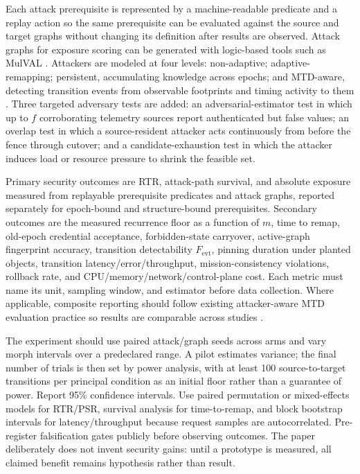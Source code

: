 \documentclass[11pt,letterpaper]{article}
\begin{document}
Each attack prerequisite is represented by a machine-readable predicate and a replay action so the same prerequisite can be evaluated against the source and target graphs without changing its definition after results are observed. Attack graphs for exposure scoring can be generated with logic-based tools such as MulVAL \cite{ou2005mulval}. Attackers are modeled at four levels: non-adaptive; adaptive-remapping; persistent, accumulating knowledge across epochs; and MTD-aware, detecting transition events from observable footprints and timing activity to them \cite{moghaddam2024}. Three targeted adversary tests are added: an adversarial-estimator test in which up to $f$ corroborating telemetry sources report authenticated but false values; an overlap test in which a source-resident attacker acts continuously from before the fence through cutover; and a candidate-exhaustion test in which the attacker induces load or resource pressure to shrink the feasible set.

Primary security outcomes are RTR, attack-path survival, and absolute exposure measured from replayable prerequisite predicates and attack graphs, reported separately for epoch-bound and structure-bound prerequisites. Secondary outcomes are the measured recurrence floor as a function of $m$, time to remap, old-epoch credential acceptance, forbidden-state carryover, active-graph fingerprint accuracy, transition detectability $F_{\mathrm{evt}}$, pinning duration under planted objects, transition latency/error/throughput, mission-consistency violations, rollback rate, and CPU/memory/network/control-plane cost. Each metric must name its unit, sampling window, and estimator before data collection. Where applicable, composite reporting should follow existing attacker-aware MTD evaluation practice so results are comparable across studies \cite{farhad2026}.

The experiment should use paired attack/graph seeds across arms and vary morph intervals over a predeclared range. A pilot estimates variance; the final number of trials is then set by power analysis, with at least 100 source-to-target transitions per principal condition as an initial floor rather than a guarantee of power. Report 95\% confidence intervals. Use paired permutation or mixed-effects models for RTR/PSR, survival analysis for time-to-remap, and block bootstrap intervals for latency/throughput because request samples are autocorrelated. Pre-register falsification gates publicly before observing outcomes. The paper deliberately does not invent security gains: until a prototype is measured, all claimed benefit remains hypothesis rather than result.
\end{document}
